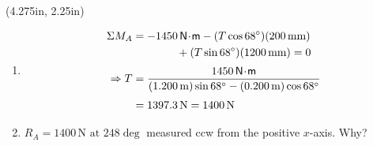 \documentclass[10pt,oneside]{article}
\begin{document}
\begin{textblock*}{3.125in}(4.275in, 2.25in)
  \large
  \begin{enumerate}
    \item 
          \begin{align*}
            \Sigma M_A &= -1450\,\mathsf{N\!\cdot\! m}-(T\cos 68^\circ)(200\,\text{mm})\\
            & \qquad\qquad +(T\sin 68^\circ)(1200\,\text{mm}) = 0 \\[0.25em]
            \Rightarrow T &= \frac{1450\,\mathsf{N\!\cdot\! m}}{(1.200\,\text{m})\sin 68^\circ-(0.200\,\text{m})\cos 68^\circ}\\[0.25em]
            &= 1397.3\,\text{N} = 1400\,\text{N}
          \end{align*}
    \item $R_A = 1400\,\text{N at }248\deg $ measured ccw from the positive $x$-axis. Why?
   
  \end{enumerate}
\end{textblock*}
\end{document}
